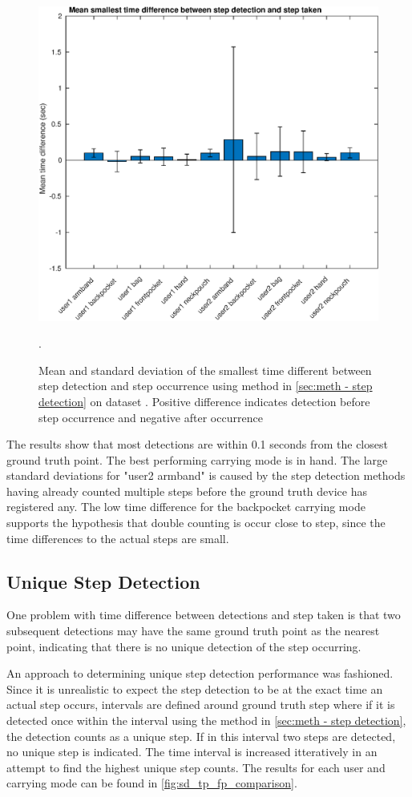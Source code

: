 \begin{figure}[H]
	\centering
	\includegraphics[width=0.7\linewidth]{images/20201127_1607_Mean_smallest_time_difference_between_step_detection_and_step_taken}
	\caption{Mean and standard deviation of the smallest time different between step detection and step occurrence using method in \cref{sec:meth - step detection} on \citet{Brajdic2013} dataset . Positive difference indicates detection before step occurrence and negative after occurrence}
	\label{fig:202011130914smallest_diff_to_gt_1}.
\end{figure}

The results show that most detections are within 0.1 seconds from the closest ground truth point. The best performing carrying mode is in hand. The large standard deviations for "user2 armband" is caused by the step detection methods having already counted multiple steps before the ground truth device has registered any. The low time difference for the backpocket carrying mode supports the hypothesis that double counting is occur close to step, since the time differences to the actual steps are small.

\subsection{Unique Step Detection}

One problem with time difference between detections and step taken is that two subsequent detections may have the same ground truth point as the nearest point, indicating that there is no unique detection of the step occurring. \par 

An approach to determining unique step detection performance was fashioned. Since it is unrealistic to expect the step detection to be at the exact time an actual step occurs, intervals are defined around ground truth step where if it is detected once within the interval using the method in \cref{sec:meth - step detection}, the detection counts as a unique step. If in this interval two steps are detected, no unique step is indicated. The time interval is increased itteratively in an attempt to find the highest unique step counts. The results for each user and carrying mode can be found in \cref{fig:sd_tp_fp_comparison}. 

